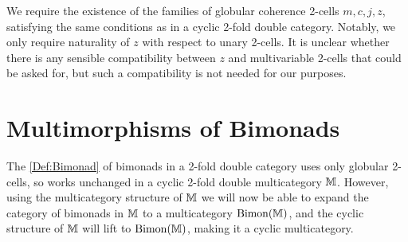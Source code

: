 We require the existence of the families of globular coherence 2-cells $m,c,j,z$, satisfying the same conditions as in a cyclic 2-fold double category. Notably, we only require naturality of $z$ with respect to unary 2-cells. It is unclear whether there is any sensible compatibility between $z$ and multivariable 2-cells that could be asked for, but such a compatibility is not needed for our purposes.

\section{Multimorphisms of Bimonads}

The \cref{Def:Bimonad} of bimonads in a 2-fold double category uses only globular 2-cells, so works unchanged in a cyclic 2-fold double multicategory $\mathbb{M}$. However, using the multicategory structure of $\mathbb{M}$ we will now be able to expand the category of bimonads in $\mathbb{M}$ to a multicategory $\mathrm{Bimon}(\mathbb{M})$, and the cyclic structure of $\mathbb{M}$ will lift to $\mathrm{Bimon}(\mathbb{M})$, making it a cyclic multicategory.

